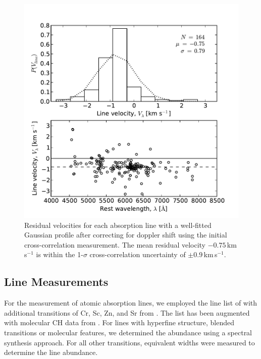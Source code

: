 \documentclass{emulateapj}
\begin{document}
\begin{figure}[h!]
	\includegraphics[width=\columnwidth]{./figures/line-velocity.pdf}
	\caption{Residual velocities for each absorption line with a well-fitted Gaussian profile after correcting for doppler shift using the initial cross-correlation measurement. The mean residual velocity $-0.75$\,km\,s$^{-1}$ is within the 1-$\sigma$ cross-correlation uncertainty of $\pm0.9$\,km\,s$^{-1}$.}
	\label{fig:line-velocities}
\end{figure}



\subsection{Line Measurements}
\label{sec:line-measurements}

For the measurement of atomic absorption lines, we employed the line list of \citet{yong;et-al_2005} with additional transitions of Cr, Sc, Zn, and Sr from \citet{roederer;et-al_2010}. The list has been augmented with molecular CH data from \citet{plez;et-al_2008}. For lines with hyperfine structure, blended transitions or molecular features, we determined the abundance using a spectral synthesis approach. For all other transitions, equivalent widths were measured to determine the line abundance.
\end{document}
